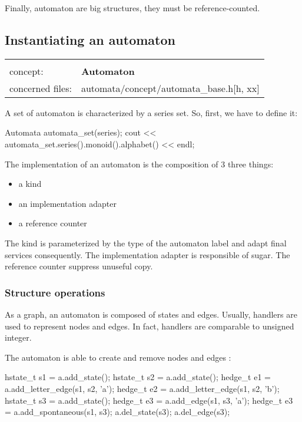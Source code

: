 \documentclass{article}
\begin{document}
Finally, automaton are big structures, they must be reference-counted.

\subsection{Instantiating an automaton}

\begin{tabular}%
{ll}
\hline \\
concept: & \textbf{Automaton}  \\
concerned files: & automata/concept/automata\_base.h[h, xx] \\
\hline 
\end{tabular}

A set of automaton is characterized by a series set. So, first, we have to define it:

\begin{code}
Automata automata_set(series);
cout << automata_set.series().monoid().alphabet() << endl;
\end{code}

The implementation of an automaton is the composition of 3 three things:

\begin{itemize}
\item a kind
\item an implementation adapter
\item a reference counter
\end{itemize}

The kind is parameterized by the type of the automaton label and adapt final services consequently. The implementation adapter is responsible of sugar. The reference counter suppress unuseful copy.

\subsubsection{Structure operations}

As a graph, an automaton is composed of states and edges. Usually, handlers are used to represent nodes and edges. In fact, handlers are comparable to unsigned integer. 

The automaton is able to create and remove nodes and edges :

\begin{code}
hstate_t s1 = a.add_state();
hstate_t s2 = a.add_state();
hedge_t e1 = a.add_letter_edge(s1, s2, 'a');
hedge_t e2 = a.add_letter_edge(s1, s2, 'b');
hstate_t s3 = a.add_state();
hedge_t e3 = a.add_edge(s1, s3, 'a');
hedge_t e3 = a.add_spontaneous(s1, s3);
a.del_state(s3);
a.del_edge(s3);
\end{code}
\end{document}
